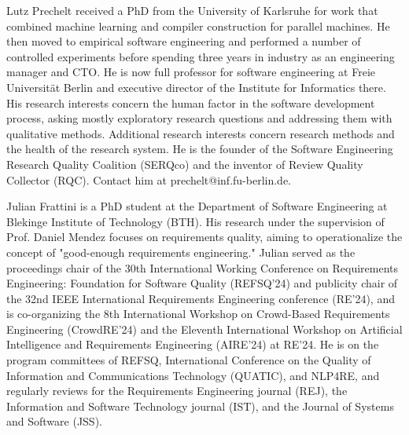 \documentclass[10pt,journal,compsoc]{IEEEtran}
\begin{document}
\begin{IEEEbiography}{Lutz Prechelt}
received a PhD from the University of Karlsruhe
for work that combined machine learning and compiler construction
for parallel machines.
He then moved to empirical software engineering and performed
a number of controlled experiments before spending three
years in industry as an engineering manager and CTO.
He is now full professor for software engineering at
Freie Universität Berlin and executive director of the
Institute for Informatics there.
His research interests concern the human
factor in the software development process, asking mostly
exploratory research questions and addressing them with
qualitative methods.
Additional research interests concern research methods
and the health of the research system.
He is the founder of the 
Software Engineering Research Quality Coalition (SERQco)
and the inventor of Review Quality Collector (RQC).
Contact him at prechelt@inf.fu-berlin.de.
\end{IEEEbiography}


\begin{IEEEbiography}{Julian Frattini}
is a PhD student at the Department of Software Engineering at Blekinge Institute of Technology (BTH). 
His research under the supervision of Prof. Daniel Mendez focuses on requirements quality, aiming to operationalize the concept of "good-enough requirements engineering." 
Julian served as the proceedings chair of the 30th International Working Conference on Requirements Engineering: Foundation for Software Quality (REFSQ'24) and publicity chair of the 32nd IEEE International Requirements Engineering conference (RE'24), and is co-organizing the 8th International Workshop on Crowd-Based Requirements Engineering (CrowdRE'24) and the Eleventh International Workshop on Artificial Intelligence and Requirements Engineering (AIRE'24) at RE'24. 
He is on the program committees of REFSQ, International Conference on the Quality of Information and Communications Technology (QUATIC), and NLP4RE, and regularly reviews for the Requirements Engineering journal (REJ), the Information and Software Technology journal (IST), and the Journal of Systems and Software (JSS).
\end{IEEEbiography}
\end{document}
